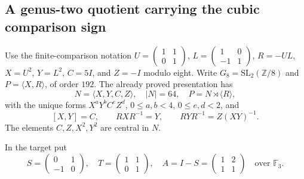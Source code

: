 \subsection{A genus-two quotient carrying the cubic comparison sign}

Use the finite-comparison notation
$U=\left(\begin{smallmatrix}1&1\\0&1\end{smallmatrix}\right)$,
$L=\left(\begin{smallmatrix}1&0\\-1&1\end{smallmatrix}\right)$,
$R=-UL$, $X=U^2$, $Y=L^2$, $C=5I$, and $Z=-I$ modulo eight.
Write $G_8=\mathrm{SL}_2(\mathbb Z/8)$ and
$P=\langle X,R\rangle$, of order $192$.
The already proved presentation has
\[
 N=\langle X,Y,C,Z\rangle,\quad |N|=64,\quad
 P=N\rtimes\langle R\rangle,
\]
with the unique forms $X^aY^bC^eZ^d$,
$0\leq a,b<4$, $0\leq e,d<2$, and
\[
 [X,Y]=C,\qquad RXR^{-1}=Y,\qquad
 RYR^{-1}=Z(XY)^{-1}.
\]
The elements $C,Z,X^2,Y^2$ are central in $N$.

In the target put
\[
 S=\begin{pmatrix}0&1\\-1&0\end{pmatrix},\quad
 T=\begin{pmatrix}1&1\\0&1\end{pmatrix},\quad
 A=I-S=\begin{pmatrix}1&2\\1&1\end{pmatrix}
 \quad\text{over }\mathbb F_3.
\]

